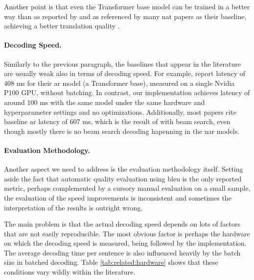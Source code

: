 Another point is that even the Transformer base model can be trained in a
better way than as reported by \citet{vaswani2017attention} and as referenced
by many \ac{nat} papers as their baseline, achieving a better translation
quality \citep{popel-bojar-2018-training}.

\paragraph{Decoding Speed.} Similarly to the previous paragraph, the baselines
that appear in the literature are usually weak also in terms of decoding speed.
For example, \citet{gu2017nonautoregressive} report latency of 408 ms for their
\ac{ar} model (a Transformer base), measured on a single Nvidia P100 GPU,
without batching. In contrast, our implementation achieves latency of around
100 ms with the same model under the same hardware and hyperparameter settings
and no optimizations. Additionally, most papers cite baseline \ac{ar} latency
of 607 ms, which is the result of \citet{gu2017nonautoregressive} with beam
search, even though mostly there is no beam search decoding hapenning in the
\ac{nar} models.




\paragraph{Evaluation Methodology.} Another aspect we need to address is the
evaluation methodology itself. Setting aside the fact that automatic quality
evaluation using \acs{bleu} is the only reported metric, perhaps complemented
by a cursory manual evaluation on a small sample, the evaluation of the speed
improvements is inconsistent and sometimes the interpretation of the results is
outright wrong.

The main problem is that the actual decoding speed depends on lots of factors
that are not easily reproducible. The most obvious factor is perhaps the
hardware on which the decoding speed is measured, being followed by the
implementation. The average decoding time per sentence is also influenced
heavily by the batch size in batched decoding. Table \ref{tab:related:hardware}
shows that these conditions vary wildly within the literature.

